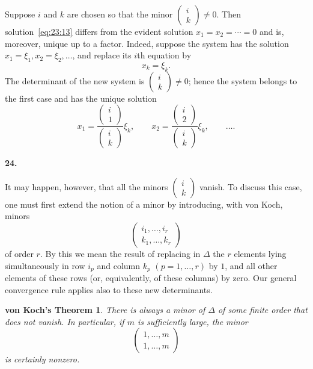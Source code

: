 \documentclass[
  paper=b5,
  fontsize=13pt,
  twoside=true,
  open=any,
  bookmarkpackage=false,
  chapterprefix=true,
  headings=normal
]{scrbook}
\newtheorem*{vonkochtheorem}{von Koch's Theorem}
\theoremstyle{definition}
\newcommand{\numberedparagraph}[1]{%
  \par\medskip\phantomsection\label{sec:#1}%
  \noindent\textbf{#1.}\enspace
}
\begin{document}
Suppose $i$ and $k$ are chosen so that the minor $\left(\begin{smallmatrix}i\\k\end{smallmatrix}\right)\ne0$. Then solution~\eqref{eq:23:13} differs from the evident solution $x_1=x_2=\cdots=0$ and is, moreover, unique up to a factor. Indeed, suppose the system has the solution $x_1=\xi_1,x_2=\xi_2,\ldots$, and replace its $i$th equation by
\[
  x_k=\xi_k.
\]
The determinant of the new system is $\left(\begin{smallmatrix}i\\k\end{smallmatrix}\right)\ne0$; hence the system belongs to the first case and has the unique solution
\[
 x_1=\frac{\left(\begin{smallmatrix}i\\1\end{smallmatrix}\right)}
           {\left(\begin{smallmatrix}i\\k\end{smallmatrix}\right)}\xi_k,
 \qquad
 x_2=\frac{\left(\begin{smallmatrix}i\\2\end{smallmatrix}\right)}
           {\left(\begin{smallmatrix}i\\k\end{smallmatrix}\right)}\xi_k,
 \qquad\ldots.
\]

\numberedparagraph{24}
It may happen, however, that all the minors $\left(\begin{smallmatrix}i\\k\end{smallmatrix}\right)$ vanish. To discuss this case, one must first extend the notion of a minor by introducing, with von Koch, minors
\[
 \left(\begin{matrix}i_1,\ldots,i_r\\k_1,\ldots,k_r\end{matrix}\right)
\]
of order $r$. By this we mean the result of replacing in $\Delta$ the $r$ elements lying simultaneously in row $i_p$ and column $k_p$ $(p=1,\ldots,r)$ by $1$, and all other elements of these rows (or, equivalently, of these columns) by zero. Our general convergence rule applies also to these new determinants.

\begin{vonkochtheorem}
There is always a minor of $\Delta$ of some finite order that does not vanish. In particular, if $m$ is sufficiently large, the minor
\[
 \left(\begin{matrix}1,\ldots,m\\1,\ldots,m\end{matrix}\right)
\]
is certainly nonzero.
\end{vonkochtheorem}
\end{document}
